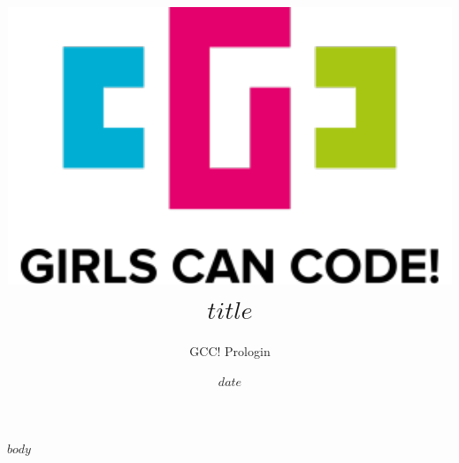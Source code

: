 \documentclass[a4paper,french,11pt]{article}
\title{
    \protect\centering\protect\includegraphics[width=.4\textwidth]{../logo_gcc_long.pdf}\\
    \vspace{.1\textheight}
    {$title$}
}
\author{GCC! \textendash{} Prologin}
\date{$date$}
\begin{document}
\maketitle

$body$
\end{document}
